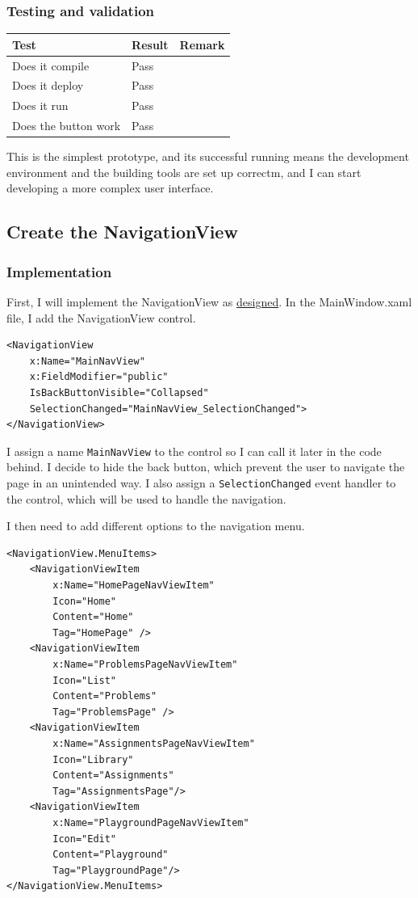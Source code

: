 \documentclass[a4paper]{report}
\newcommand{\code}{\texttt}
\begin{document}
\subsubsection{Testing and validation}

\begin{tabulary}{\linewidth}{|L|l|L|}
    \hline
    Test & Result & Remark \\
    \hline
    Does it compile & Pass & \\
    \hline
    Does it deploy & Pass & \\
    \hline
    Does it run & Pass & \\
    \hline
    Does the button work & Pass & \\
    \hline
\end{tabulary}

This is the simplest prototype, and its successful running means the development environment and the building tools are set up correctm, and I can start developing a more complex user interface.

\subsection{Create the NavigationView}

\subsubsection{Implementation}

First, I will implement the NavigationView as \hyperref[sec:NavigationViewDesign]{designed}. In the MainWindow.xaml file, I add the NavigationView control.

\begin{verbatim}
<NavigationView 
    x:Name="MainNavView"
    x:FieldModifier="public"
    IsBackButtonVisible="Collapsed"
    SelectionChanged="MainNavView_SelectionChanged">
</NavigationView>
\end{verbatim}

I assign a name \code{MainNavView} to the control so I can call it later in the code behind. I decide to hide the back button, which prevent the user to navigate the page in an unintended way. I also assign a \code{SelectionChanged} event handler to the control, which will be used to handle the navigation.

I then need to add different options to the navigation menu.

\begin{verbatim}
<NavigationView.MenuItems>
    <NavigationViewItem 
        x:Name="HomePageNavViewItem"
        Icon="Home"
        Content="Home"
        Tag="HomePage" />
    <NavigationViewItem
        x:Name="ProblemsPageNavViewItem"
        Icon="List"
        Content="Problems"
        Tag="ProblemsPage" />
    <NavigationViewItem
        x:Name="AssignmentsPageNavViewItem"
        Icon="Library"
        Content="Assignments"
        Tag="AssignmentsPage"/>
    <NavigationViewItem
        x:Name="PlaygroundPageNavViewItem"
        Icon="Edit"
        Content="Playground"
        Tag="PlaygroundPage"/>
</NavigationView.MenuItems>
\end{verbatim}
\end{document}
